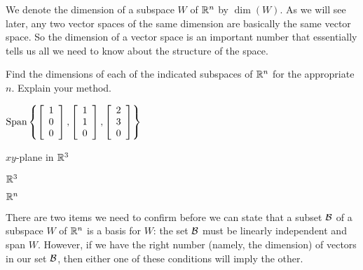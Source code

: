 We denote the dimension of a subspace $W$ of $\mathbb{R}^n$ by $\dim(W)$. As we will see later, any two vector spaces of the same dimension are basically the same vector space. So the dimension of a vector space is an important number that essentially tells us all we need to know about the structure of the space. 



\begin{activity} \label{act:3_d_2} Find the dimensions of each of the indicated subspaces of $\mathbb{R}^n$ for the appropriate $n$. Explain your method. 
	\ba

	\item $\text{Span}\left\{ \left[ \begin{array}{c} 1 \\ 0 \\ 0 \end{array} \right], \left[ \begin{array}{c} 1 \\ 1 \\ 0 \end{array} \right], \left[ \begin{array}{c} 2 \\ 3 \\ 0 \end{array} \right] \right\}$ 



	\item $xy$-plane in $\mathbb{R}^3$



	\item $\mathbb{R}^3$ 
	
	
	
	\item $\mathbb{R}^n$
	
	

	\ea
	

\end{activity}



\label{sec:cond_basis_subspace}

There are two items we need to confirm before we can state that a subset $\mathcal{B}$ of a subspace $W$ of $\mathbb{R}^n$ is a basis for $W$: the set $\mathcal{B}$ must be linearly independent and span $W$. However, if we have the right number (namely, the dimension) of vectors in our set $\mathcal{B}$, then either one of these conditions will imply the other. 




